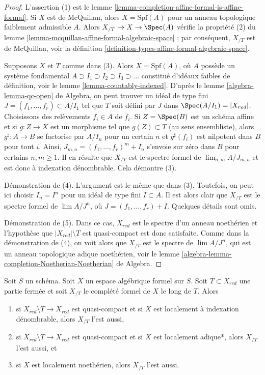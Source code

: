 \begin{proof}
L'assertion (1) est le lemme \ref{lemma-completion-affine-formal-is-affine-formal}.
Si $X$ est de McQuillan, alors $X = \text{Spf}(A)$ pour un anneau topologique
faiblement admissible $A$. Alors $X_{/T} \to X \to \Spec(A)$ vérifie
la propriété (2) du lemme \ref{lemma-mcquillan-affine-formal-algebraic-space} ;
par conséquent, $X_{/T}$ est de McQuillan, voir la
définition \ref{definition-types-affine-formal-algebraic-space}.

\medskip\noindent
Supposons $X$ et $T$ comme dans (3).
Alors $X = \text{Spf}(A)$, où $A$ possède un système fondamental
$A \supset I_1 \supset I_2 \supset I_3 \supset \ldots$
constitué d'idéaux faibles de définition, voir le lemme \ref{lemma-countably-indexed}.
D'après le lemme \ref{algebra-lemma-qc-open} de Algebra,
on peut trouver un idéal de type fini
$\overline{J} = (\overline{f}_1, \ldots, \overline{f}_r) \subset A/I_1$
tel que $T$ soit défini par $\overline{J}$ dans $\Spec(A/I_1) = |X_{red}|$.
Choisissons des relèvements $f_i \in A$ de $\overline{f}_i$.
Si $Z = \Spec(B)$ est un schéma affine et si $g : Z \to X$ est
un morphisme tel que $g(Z) \subset T$ (au sens ensembliste), alors
$g^\sharp : A \to B$ se factorise par $A/I_n$ pour un certain $n$
et $g^\sharp(f_i)$ est nilpotent dans $B$ pour tout $i$. Ainsi,
$J_{m, n} = (f_1, \ldots, f_r)^m + I_n$ s'envoie sur zéro dans $B$
pour certains $n, m \geq 1$. Il en résulte que $X_{/T}$ est le spectre formel de
$\lim_{n, m} A/J_{m, n}$ et est donc à indexation dénombrable.
Cela démontre (3).

\medskip\noindent
Démonstration de (4). L'argument est le même que dans (3).
Toutefois, on peut ici choisir $I_n = I^n$ pour un idéal de type fini
$I \subset A$. Il est alors clair que $X_{/T}$ est le spectre formel de
$\lim A/J^n$, où $J = (f_1, \ldots, f_r) + I$. Quelques détails sont omis.

\medskip\noindent
Démonstration de (5). Dans ce cas, $X_{red}$ est le spectre d'un anneau noethérien
et l'hypothèse que $|X_{red}| \setminus T$ est quasi-compact
est donc satisfaite. Comme dans la démonstration de (4), on voit alors que
$X_{/T}$ est le spectre de $\lim A/J^n$, qui est un anneau topologique
adique noethérien, voir le
lemme \ref{algebra-lemma-completion-Noetherian-Noetherian} de Algebra.
\end{proof}

\begin{lemma}
\label{lemma-recompletion-types}
Soit $S$ un schéma. Soit $X$ un espace algébrique formel sur $S$.
Soit $T \subset X_{red}$ une partie fermée et soit $X_{/T}$
le complété formel de $X$ le long de $T$. Alors
\begin{enumerate}
\item si $X_{red} \setminus T \to X_{red}$ est quasi-compact et si $X$
est localement à indexation dénombrable, alors $X_{/T}$ l'est aussi,
\item si $X_{red} \setminus T \to X_{red}$ est quasi-compact et si $X$
est localement adique*, alors $X_{/T}$ l'est aussi, et
\item si $X$ est localement noethérien, alors $X_{/T}$ l'est aussi.
\end{enumerate}
\end{lemma}

